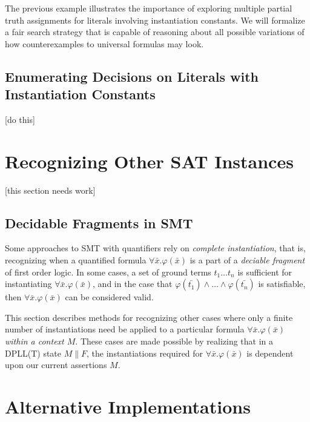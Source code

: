 \documentclass{llncs}
\begin{document}
The previous example illustrates the importance of exploring multiple partial truth assignments for literals involving instantiation constants.
We will formalize a fair search strategy that is capable of reasoning about all possible variations of how counterexamples to universal formulas may look.

\subsection{Enumerating Decisions on Literals with Instantiation Constants}

[do this]

\section{Recognizing Other SAT Instances}

[this section needs work]

\subsection{Decidable Fragments in SMT}

Some approaches to SMT with quantifiers rely on \emph{complete instantiation}, that is, recognizing when a quantified formula $\forall \bar{ x }. \varphi( \bar{ x } )$ is a part of a \emph{deciable fragment} of first order logic.
In some cases, a set of ground terms $t_1 \ldots t_n$ is sufficient for instantiating $\forall \bar{ x }. \varphi( \bar{ x } )$, and in the case that $\varphi( \bar{ t_1 } ) \wedge \ldots \wedge \varphi( \bar{ t_n } )$ is satisfiable, then $\forall \bar{ x }. \varphi( \bar{ x } )$ can be considered valid.

This section describes methods for recognizing other cases where only a finite number of instantiations need be applied to a particular formula $\forall \bar{ x }. \varphi( \bar{ x } )$ \emph{within a context $M$}.
These cases are made possible by realizing that in a DPLL(T) state $M \parallel F$, the instantiations required for $\forall \bar{ x }. \varphi( \bar{ x } )$ is dependent upon our current assertions $M$.

\section{Alternative Implementations}
\label{sec:implementation}
\end{document}
